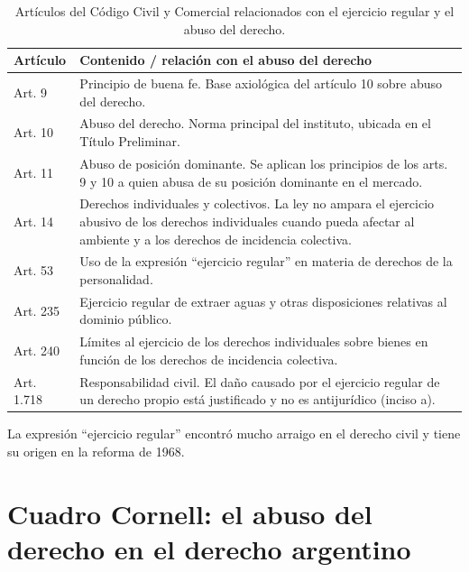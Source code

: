 \documentclass[12pt,oneside]{book}
\begin{document}
\begin{table}[H]
\centering
\begin{tabularx}{\textwidth}{
    >{\raggedright\arraybackslash}p{2.3cm}
    >{\raggedright\arraybackslash}X
}
\toprule
\textbf{Artículo} & \textbf{Contenido / relación con el abuso del derecho} \\
\midrule
Art. 9 & Principio de buena fe. Base axiológica del artículo 10 sobre abuso del derecho. \\
\addlinespace
Art. 10 & Abuso del derecho. Norma principal del instituto, ubicada en el Título Preliminar. \\
\addlinespace
Art. 11 & Abuso de posición dominante. Se aplican los principios de los arts. 9 y 10 a quien abusa de su posición dominante en el mercado. \\
\addlinespace
Art. 14 & Derechos individuales y colectivos. La ley no ampara el ejercicio abusivo de los derechos individuales cuando pueda afectar al ambiente y a los derechos de incidencia colectiva. \\
\addlinespace
Art. 53 & Uso de la expresión ``ejercicio regular'' en materia de derechos de la personalidad. \\
\addlinespace
Art. 235 & Ejercicio regular de extraer aguas y otras disposiciones relativas al dominio público. \\
\addlinespace
Art. 240 & Límites al ejercicio de los derechos individuales sobre bienes en función de los derechos de incidencia colectiva. \\
\addlinespace
Art. 1.718 & Responsabilidad civil. El daño causado por el ejercicio regular de un derecho propio está justificado y no es antijurídico (inciso a). \\
\bottomrule
\end{tabularx}
\caption{Artículos del Código Civil y Comercial relacionados con el ejercicio regular y el abuso del derecho.}
\end{table}

La expresión ``ejercicio regular'' encontró mucho arraigo en el derecho civil y tiene su origen en la reforma de 1968.

\section{Cuadro Cornell: el abuso del derecho en el derecho argentino}
\end{document}
